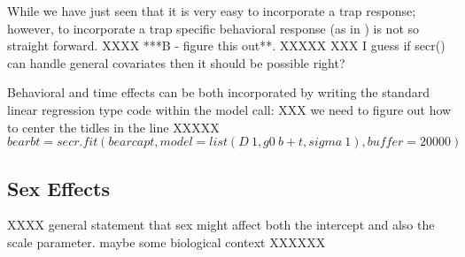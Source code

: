While we have just seen that 
it is very easy to incorporate a trap response; however, to
incorporate a trap specific behavioral response (as in
\citet{royle_etal:2009}) is not so straight forward.  XXXX ***B - figure
this out**. XXXXX 
XXX I guess if secr() can handle general covariates then it should be
possible right?


Behavioral and time effects can be both incorporated by writing the standard linear regression type code within the model call:
XXX we need to figure out how to center the tidles in the line XXXXX
\[
bearbt=secr.fit (bearcapt, model = list(D~1, g0~b + t, sigma~1), buffer = 20000)
\]

\subsection{Sex Effects}



XXXX general statement that sex might affect both the intercept and
also the scale parameter. maybe some biological context XXXXXX

